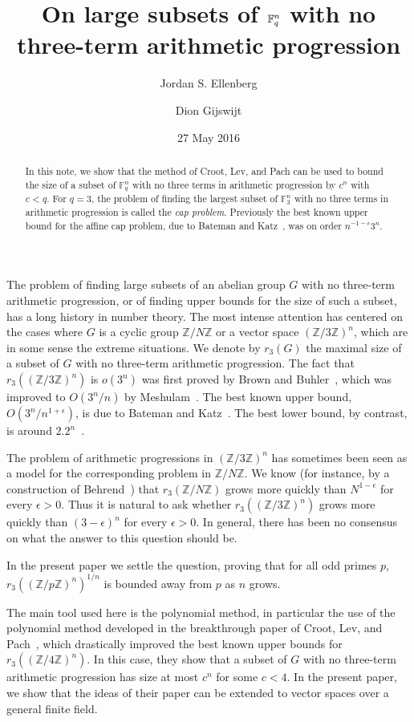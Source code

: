 \documentclass[12pt]{amsart}
\title{On large subsets of $\F_q^n$ with no three-term arithmetic progression}
\author{Jordan S. Ellenberg }
\author{Dion Gijswijt}
\date{27 May 2016}
\newcommand{\field}[1]{\mathbb{#1}}
\newcommand{\Z}{\field{Z}}
\newcommand{\F}{\field{F}}
\theoremstyle{plain}
\theoremstyle{definition}
\theoremstyle{remark}
\begin{document}
\begin{abstract}
In this note, we show that the method of Croot, Lev, and Pach can be used to bound the size of a subset of $\F_q^n$ with no three terms in arithmetic progression by $c^n$ with $c < q$.  For $q=3$, the problem of finding the largest subset of $\F_3^n$ with no three terms in arithmetic progression is called the {\em cap problem}.  Previously the best known upper bound for the affine cap problem, due to Bateman and Katz~\cite{bateman}, was on order $n^{-1-\epsilon} 3^n$.
\end{abstract}


\maketitle

The problem of finding large subsets of an abelian group $G$ with no three-term arithmetic progression, or of finding upper bounds for the size of such a subset, has a long history in number theory.  The most intense attention has centered on the cases where $G$ is a cyclic group $\Z/N\Z$ or a vector space $(\Z/3\Z)^n$, which are in some sense the extreme situations.  We denote by $r_3(G)$ the maximal size of a subset of $G$ with no three-term arithmetic progression.  The fact that $r_3((\Z/3\Z)^n)$ is $o(3^n)$ was first proved by Brown and Buhler~\cite{brownbuhler}, which was improved to $O(3^n/n)$ by Meshulam~\cite{meshulam}. The best known upper bound, $O(3^n/n^{1+\epsilon})$, is due to Bateman and Katz~\cite{bateman}. The best lower bound, by contrast, is around $2.2^n$~\cite{edel}. 

The problem of arithmetic progressions in $(\Z/3\Z)^n$ has sometimes been seen as a model for the corresponding problem in $\Z/N\Z$.  We know (for instance, by a construction of Behrend~\cite{behrend}) that $r_3(\Z/N\Z)$ grows more quickly than $N^{1-\epsilon}$ for every $\epsilon > 0$.  Thus it is natural to ask whether $r_3((\Z/3\Z)^n)$ grows more quickly than $(3-\epsilon)^n$ for every $\epsilon > 0$.  In general, there has been no consensus on what the answer to this question should be.

In the present paper we settle the question, proving that for all odd primes $p$, $r_3((\Z/p\Z)^n)^{1/n}$ is bounded away from $p$ as $n$ grows.  

The main tool used here is the polynomial method, in particular the use of the polynomial method developed in the breakthrough paper of Croot, Lev, and Pach~\cite{CLP}, which drastically improved the best known upper bounds for $r_3((\Z/4\Z)^n)$.  In this case, they show that a subset of $G$ with no three-term arithmetic progression has size at most $c^n$ for some $c < 4$.  In the present paper, we show that the ideas of their paper can be extended to vector spaces over a general finite field.
\end{document}

